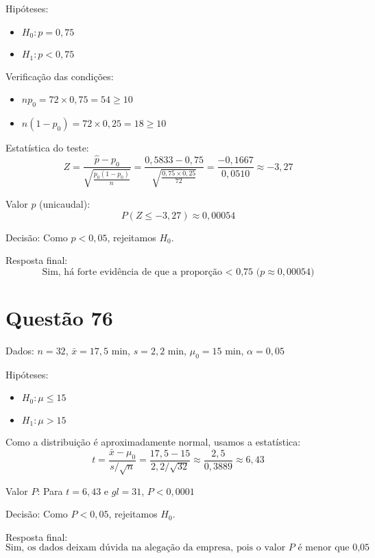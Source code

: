 \documentclass[12pt]{article}
\newcommand{\quest}[1]{\section*{Questão #1}} %
\begin{document}
Hipóteses:
\begin{itemize}
  \item $H_0: p = 0{,}75$
  \item $H_1: p < 0{,}75$
\end{itemize}

Verificação das condições:
\begin{itemize}
  \item $np_0 = 72 \times 0{,}75 = 54 \geq 10$
  \item $n(1 - p_0) = 72 \times 0{,}25 = 18 \geq 10$
\end{itemize}

Estatística do teste:
\[
Z = \frac{\hat{p} - p_0}{\sqrt{\frac{p_0(1 - p_0)}{n}}} = \frac{0{,}5833 - 0{,}75}{\sqrt{\frac{0{,}75 \times 0{,}25}{72}}} = \frac{-0{,}1667}{0{,}0510} \approx -3{,}27
\]

Valor $p$ (unicaudal):
\[
P(Z \leq -3{,}27) \approx 0{,}00054
\]

Decisão: Como $p < 0{,}05$, rejeitamos $H_0$.

Resposta final:
\[
\boxed{\text{Sim, h\'a forte evid\^encia de que a propor\c{c}\~ao < 0{,}75 ($p \approx 0{,}00054$)}}
\]


\quest{76}

Dados: $n = 32$, $\bar{x} = 17{,}5$ min, $s = 2{,}2$ min, $\mu_0 = 15$ min, $\alpha = 0{,}05$

Hip\'oteses:
\begin{itemize}
  \item $H_0: \mu \leq 15$
  \item $H_1: \mu > 15$
\end{itemize}

Como a distribui\c{c}\~ao \'{e} aproximadamente normal, usamos a estat\'istica:
\[
t = \frac{\bar{x} - \mu_0}{s / \sqrt{n}} = \frac{17{,}5 - 15}{2{,}2 / \sqrt{32}} \approx \frac{2{,}5}{0{,}3889} \approx 6{,}43
\]

Valor $P$: Para $t = 6{,}43$ e $gl = 31$, $P < 0{,}0001$

Decis\~ao: Como $P < 0{,}05$, rejeitamos $H_0$.

Resposta final:
\[
\boxed{\text{Sim, os dados deixam d\'uvida na alega\c{c}\~ao da empresa, pois o valor $P$ \'{e} menor que 0{,}05}}
\]
\end{document}
